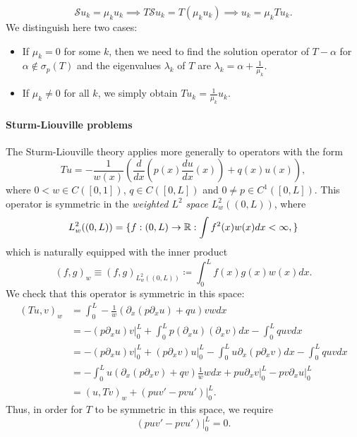 \begin{equation*}
    \mathcal{S}u_k = \mu_k u_k \implies T\mathcal{S}u_k = T(\mu_k u_k) \implies u_k = \mu_k Tu_k.
\end{equation*}
We distinguish here two cases: 
\begin{itemize}
    \item If $\mu_k=0$ for some $k$, then we need to find the solution operator of $T-\alpha$ for $\alpha\notin \sigma_p(T)$ and the eigenvalues $\lambda_k$ of $T$ are $\lambda_k = \alpha + \frac{1}{\mu_k}$. 
    \item If $\mu_k\neq 0$ for all $k$, we simply obtain $Tu_k = \frac{1}{\mu_k}u_k$.
\end{itemize}

\paragraph{Sturm-Liouville problems} The Sturm-Liouville theory applies more generally to operators with the form 
\begin{equation*}
    Tu = -\frac{1}{w(x)}\left(\frac{d}{dx}\left(p(x)\frac{du}{dx}(x)\right) + q(x)u(x)\right),
\end{equation*}
where $0<w\in C([0,1])$, $q\in C([0,L])$ and $0\neq p\in C^1([0,L])$. This operator is symmetric in the \textit{weighted $L^2$ space} $L^2_w((0,L))$, where
\begin{equation*}
    L^2_w((0,L)) = \{f:(0,L)\to \mathbb{R}: \int f^2(x)w(x) dx < \infty,\}
\end{equation*}
which is naturally equipped with the inner product
\begin{equation*}
    (f,g)_w \equiv (f,g)_{L^2_w((0,L))} \coloneqq \int_0^L f(x)g(x)w(x) dx.
\end{equation*}
We check that this operator is symmetric in this space:
\begin{align*}
    (Tu,v)_w &= \int_0^L -\frac{1}{w}\left(\partial_x (p\partial_x u) + qu\right)vwdx\\
    &= -\left.(p\partial_x u)v\right|_0^L + \int_0^L p(\partial_x u)(\partial_x v) dx - \int_0^L quvdx\\
    &= -\left.(p\partial_x u)v\right|_0^L + \left.(p\partial_x v)u\right|_0^L - \int_0^L u\partial_x(p\partial_x v)dx - \int_0^L quvdx \\
    &= -\int_0^L u\left(\partial_x (p\partial_x v) + qv\right)\frac{1}{w}wdx + \left.pu\partial_x v\right|_0^L - \left.pv\partial_x u\right|_0^L\\
    &= (u,Tv)_w + \left.(puv' - pvu')\right|_0^L.
\end{align*}
Thus, in order for $T$ to be symmetric in this space, we require 
\begin{equation*}
    \left.(puv' - pvu')\right|_0^L = 0.
\end{equation*}
